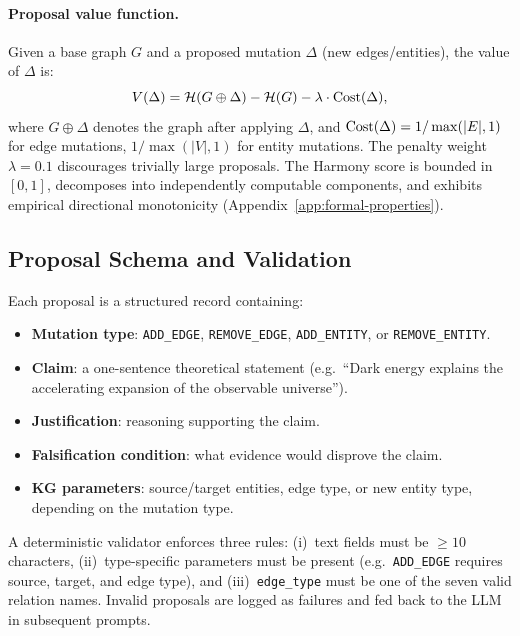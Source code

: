\paragraph{Proposal value function.}
Given a base graph $G$ and a proposed mutation $\Delta$ (new edges/entities),
the value of $\Delta$ is:
\begin{equation}\label{eq:value}
  V(\Delta) = \mathcal{H}(G \oplus \Delta) - \mathcal{H}(G) - \lambda \cdot \operatorname{Cost}(\Delta),
\end{equation}
where $G \oplus \Delta$ denotes the graph after applying $\Delta$, and
$\operatorname{Cost}(\Delta) = 1/\max(|E|,1)$ for edge mutations,
$1/\max(|V|,1)$ for entity mutations.
The penalty weight $\lambda = 0.1$ discourages trivially large proposals.
The Harmony score is bounded in $[0,1]$, decomposes into independently
computable components, and exhibits empirical directional monotonicity
(Appendix~\ref{app:formal-properties}).

\subsection{Proposal Schema and Validation}\label{sec:proposals}

Each proposal is a structured record containing:
\begin{itemize}[nosep]
  \item \textbf{Mutation type}: \texttt{ADD\_EDGE}, \texttt{REMOVE\_EDGE},
    \texttt{ADD\_ENTITY}, or \texttt{REMOVE\_ENTITY}.
  \item \textbf{Claim}: a one-sentence theoretical statement (e.g.\
    ``Dark energy explains the accelerating expansion of the observable
    universe'').
  \item \textbf{Justification}: reasoning supporting the claim.
  \item \textbf{Falsification condition}: what evidence would disprove the claim.
  \item \textbf{KG parameters}: source/target entities, edge type, or new entity
    type, depending on the mutation type.
\end{itemize}

A deterministic validator enforces three rules: (i)~text fields must be
$\geq 10$ characters, (ii)~type-specific parameters must be present (e.g.\
\texttt{ADD\_EDGE} requires source, target, and edge type), and
(iii)~\texttt{edge\_type} must be one of the seven valid relation names.
Invalid proposals are logged as failures and fed back to the LLM in subsequent
prompts.

